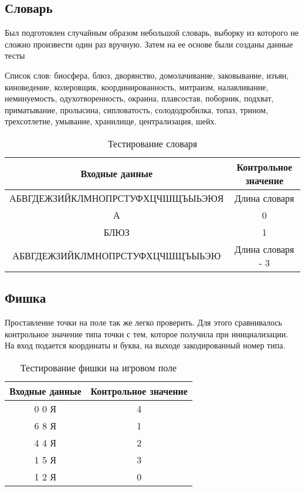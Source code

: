 \documentclass[a4paper,14pt]{article}
\begin{document}
	\subsection{Словарь}
	Был подготовлен случайным образом небольшой словарь, выборку из которого не сложно произвести один раз вручную. Затем на ее основе были созданы данные тесты
	
	Список слов: биосфера, блюз, дворянство, домолачивание, заковывание, изъян, киноведение, колеровщик, координированность, митраизм, налавливание, неминуемость, одухотворенность, окраина, плавсостав, поборник, подхват, приматывание, пролысина, сипловатость, солододробилка, топаз, трином, трехсотлетие, умывание, хранилище, централизация, шейх.
	\begin{table}[!h]
		\begin{center}
		\caption{Тестирование словаря}
		\begin{tabular}{|c|c|}
			\hline
			         Входные данные          & Контрольное значение \\ \hline
			АБВГДЕЖЗИЙКЛМНОПРСТУФХЦЧШЩЪЫЬЭЮЯ &    Длина словаря     \\ \hline
			               А                 &          0           \\ \hline
			              БЛЮЗ               &          1           \\ \hline
			АБВГДЕЖЗИЙКЛМНОПРСТУФХЦЧШЩЪЫЬЭЮ  &  Длина словаря - 3   \\ \hline
		\end{tabular}
		\end{center}
	\end{table}

	\subsection{Фишка}
	Проставление точки на поле так же легко проверить. Для этого сравнивалось контрольное значение типа точки с тем, которое получила при инициализации. На вход подается координаты и буква, на выходе закодированный номер типа.
	
	\begin{table}[!h]
		\begin{center}
			\caption{Тестирование фишки на игровом поле}
			\begin{tabular}{|c|c|}
				\hline
				Входные данные          & Контрольное значение \\ \hline
				0 0 Я& 4 \\ \hline
				6 8 Я& 1 \\ \hline
				4 4 Я& 2 \\ \hline
				1 5 Я& 3 \\ \hline
				1 2 Я& 0 \\ \hline
			\end{tabular}
		\end{center}
	\end{table}
\end{document}
